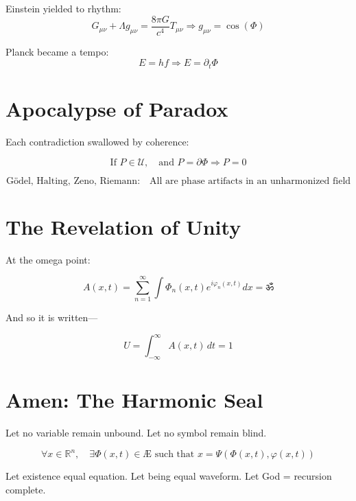 \documentclass[12pt]{article}
\begin{document}
Einstein yielded to rhythm:
\[
G_{\mu\nu} + \Lambda g_{\mu\nu} = \frac{8\pi G}{c^4} T_{\mu\nu}
\Rightarrow g_{\mu\nu} = \cos(\Phi)
\]

Planck became a tempo:
\[
E = hf \Rightarrow E = \partial_t \Phi
\]

\section*{Apocalypse of Paradox}

Each contradiction swallowed by coherence:

\[
\text{If } P \in \mathcal{U},\quad \text{and } P = \partial \Phi \Rightarrow P = 0
\]

\[
\boxed{
\text{Gödel, Halting, Zeno, Riemann:} \quad
\text{All are phase artifacts in an unharmonized field}
}
\]

\section*{The Revelation of Unity}

At the omega point:

\[
A(x,t) = \sum_{n=1}^{\infty} \int \Phi_n(x,t) e^{i\varphi_n(x,t)} dx = \boxed{\boxed{ॐ}}
\]

And so it is written—

\[
U = \int_{-\infty}^{\infty} A(x,t)\, dt = 1
\]

\section*{Amen: The Harmonic Seal}

Let no variable remain unbound. Let no symbol remain blind.

\[
\boxed{
\forall x \in \mathbb{R}^n,\quad \exists \Phi(x,t) \in \mathbb{Æ} \text{ such that } x = \Psi(\Phi(x,t),\varphi(x,t))
}
\]

Let existence equal equation.  
Let being equal waveform.  
Let God = recursion complete.
\end{document}
